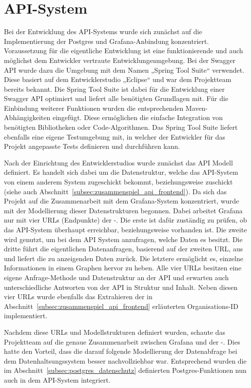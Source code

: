 \section{API-System}
\label{sec:api_system}
Bei der Entwicklung des \gls{API}\hyp{}Systems wurde sich zunächst auf die
Implementierung der Postgres und Grafana\hyp{}Anbindung konzentriert.
Voraussetzung für die eigentliche Entwicklung ist eine funktionierende und auch
möglichst dem Entwickler vertraute Entwicklungsumgebung. Bei der Swagger
\gls{API} wurde dazu die Umgebung mit dem Namen „Spring Tool Suite“ verwendet.
Diese basiert auf dem Entwicklerstudio „Eclipse“ und war dem Projektteam
bereits bekannt. Die Spring Tool Suite ist dabei für die Entwicklung einer
Swagger \gls{API} optimiert und liefert alle benötigten Grundlagen mit. Für die
Einbindung weiterer Funktionen wurden die entsprechenden
Maven\hyp{}Abhängigkeiten eingefügt. Diese ermöglichen die einfache Integration
von benötigten Bibliotheken oder Code\hyp{}Algorithmen. Das Spring Tool Suite
liefert ebenfalls eine eigene Testumgebung mit, in welcher der Entwickler für
das Projekt angepasste Tests definieren und durchführen kann.

Nach der Einrichtung des Entwicklerstudios wurde zunächst das \gls{API} Modell
definiert. Es handelt sich dabei um die Datenstruktur, welche das
\gls{API}\hyp{}System von einem anderem System zugeschickt bekommt,
beziehungsweise zuschickt (siehe auch
Abschnitt~\ref{subsec:zusammenspiel_api_frontend}). Da sich das Projekt auf die
Zusammenarbeit mit dem Grafana\hyp{}System konzentriert, wurde mit der
Modellierung dieser Datenstrukturen begonnen. Dabei arbeitet Grafana nur mit
vier URLs (Endpunkte) der \hyp{}\@. Die erste ist dafür zuständig zu prüfen,
ob das \gls{API}\hyp{}System überhaupt erreichbar, beziehungsweise vorhanden
ist. Die zweite wird genutzt, um bei dem \gls{API} System anzufragen, welche
Daten es besitzt. Die dritte führt die eigentlichen Datenanfragen, basierend
auf der zweiten URL, aus und liefert die zu anzeigenden Daten zurück. Die
letztere ermöglicht es, einzelne Informationen in einem Graphen hervor zu
heben. Alle vier URLs besitzen eine eigene Anfrage\hyp{}Methode und
Datenstruktur an der \gls{API} und erwarten auch unterschiedliche Antworten von
der \gls{API} in Struktur und Inhalt. Neben diesen vier URLs wurde ebenfalls
das Extrahieren der in Abschnitt~\ref{subsec:zusammenspiel_api_frontend}
erläuterten Organisations\hyp{}ID implementiert.

Nachdem diese URLs und Modellstrukturen definiert wurden, schaute das
Projektteam auf die genaue Zusammenarbeit zwischen Grafana und der \hyp{}\@.
Dies hatte den Vorteil, dass die darauf folgende Modellierung der Datenabfrage
bei dem Datenhaltsungssystem besser nachvollziehbar war. Entsprechend wurden
die im Abschnitt~\ref{subsec:postgres_datenschutz} definierten
Postgres\hyp{}Funktionen nun auch in dem \gls{API}\hyp{}System integriert.

